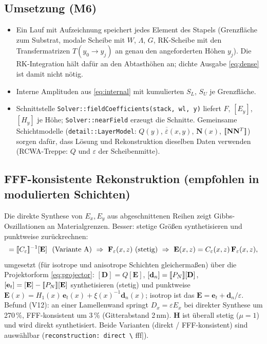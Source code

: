 \subsection{Umsetzung (M6)}
\begin{itemize}[nosep]
  \item Ein Lauf mit Aufzeichnung speichert jedes Element des Stapels (Grenzfläche zum Substrat, modale Scheibe
        mit $W$, $\Lambda$, $G$, RK-Scheibe mit den Transfermatrizen $T(y_0\to y_j)$ an genau den angeforderten
        Höhen $y_j$). Die RK-Integration hält dafür an den Abtasthöhen an; dichte Ausgabe \eqref{eq:dense}
        ist damit nicht nötig.
  \item Interne Amplituden aus \eqref{eq:internal} mit kumulierten $S_L$, $S_U$ je Grenzfläche.
  \item Schnittstelle \verb|Solver::fieldCoefficients(stack, wl, y)| liefert $F$, $[E_y]$, $[H_y]$ je Höhe;
        \verb|Solver::nearField| erzeugt die Schnitte. Gemeinsame Schichtmodelle (\verb|detail::LayerModel|:
        $Q(y)$, $\overline{\overline\varepsilon}(x,y)$, $\mathbf N(x)$, $[\![\mathbf N\mathbf N^T]\!]$) sorgen dafür, dass
        Lösung und Rekonstruktion dieselben Daten verwenden (RCWA-Treppe: $Q$ und $\varepsilon$ der Scheibenmitte).
\end{itemize}

\subsection{FFF-konsistente Rekonstruktion (empfohlen in modulierten Schichten)}
Die direkte Synthese von $E_x,E_y$ aus abgeschnittenen Reihen zeigt Gibbs-Oszillationen an
Materialgrenzen. Besser: stetige Größen synthetisieren und punktweise zurückrechnen:
\begin{equation}
  [\mathbf F_\varepsilon]=\tp{C_\varepsilon}^{-1}[\mathbf E]\ \ \text{(Variante A)}\ \Rightarrow\ \mathbf F_\varepsilon(x,z)\ \text{(stetig)}
  \ \Rightarrow\ \mathbf E(x,z)=C_\varepsilon(x,z)\,\mathbf F_\varepsilon(x,z),
  \label{eq:recon}
\end{equation}
umgesetzt (für isotrope und anisotrope Schichten gleichermaßen) über die Projektorform \eqref{eq:projector}:
$[\mathbf D]=Q[\mathbf E]$, $[\mathbf d_n]=[\![P_N]\!][\mathbf D]$, $[\mathbf e_t]=[\mathbf E]-[\![P_N]\!][\mathbf E]$ synthetisieren
(stetig) und punktweise $\mathbf E(x)=H_1(x)\,\mathbf e_t(x)+\xi(x)^{-1}\mathbf d_n(x)$; isotrop ist das
$\mathbf E=\mathbf e_t+\mathbf d_n/\varepsilon$. Befund (V12): an einer Lamellenwand springt $D_x=\varepsilon E_x$ bei
direkter Synthese um 270\,\%, FFF-konsistent um 3\,\% (Gitterabstand 2\,nm). $\mathbf H$ ist überall stetig ($\mu=1$) und wird direkt synthetisiert.
Beide Varianten (direkt / FFF-konsistent) sind auswählbar (\verb|reconstruction: direct \| fff|).

